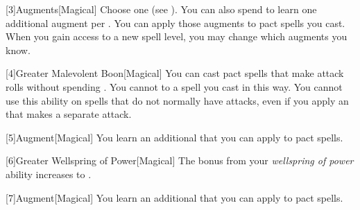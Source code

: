         [3]{Augments}[Magical]
        Choose one  (see ).
        You can also spend  to learn one additional augment per .
        You can apply those augments to pact spells you cast.
        When you gain access to a new spell level, you may change which augments you know.

        [4]{Greater Malevolent Boon}[Magical] You can cast pact spells that make attack rolls without spending .
        You cannot  to a spell you cast in this way.
        You cannot use this ability on spells that do not normally have attacks, even if you apply an  that makes a separate attack.

        [5]{Augment}[Magical]
        You learn an additional  that you can apply to pact spells.

        [6]{Greater Wellspring of Power}[Magical]
        The bonus from your \textit{wellspring of power} ability increases to .

        [7]{Augment}[Magical]
        You learn an additional  that you can apply to pact spells.
